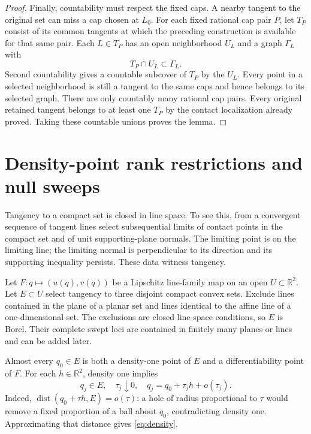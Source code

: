 \documentclass[11pt]{article}
\newcommand{\R}{\mathbb R}
\theoremstyle{remark}
\begin{document}
\begin{proof}
Finally, countability must respect the fixed caps. A nearby tangent to the original set can miss a cap chosen at $L_0$. For each fixed rational cap pair $P$, let $T_P$ consist of its common tangents at which the preceding construction is available for that same pair. Each $L\in T_P$ has an open neighborhood $U_L$ and a graph $\Gamma_L$ with
\[
T_P\cap U_L\subset\Gamma_L.
\]
Second countability gives a countable subcover of $T_P$ by the $U_L$. Every point in a selected neighborhood is still a tangent to the same caps and hence belongs to its selected graph. There are only countably many rational cap pairs. Every original retained tangent belongs to at least one $T_P$ by the contact localization already proved. Taking these countable unions proves the lemma.
\end{proof}

\section{Density-point rank restrictions and null sweeps}
Tangency to a compact set is closed in line space. To see this, from a convergent sequence of tangent lines select subsequential limits of contact points in the compact set and of unit supporting-plane normals. The limiting point is on the limiting line; the limiting normal is perpendicular to its direction and its supporting inequality persists. These data witness tangency.

Let $F:q\mapsto(u(q),v(q))$ be a Lipschitz line-family map on an open $U\subset\R^2$. Let $E\subset U$ select tangency to three disjoint compact convex sets. Exclude lines contained in the plane of a planar set and lines identical to the affine line of a one-dimensional set. The exclusions are closed line-space conditions, so $E$ is Borel. Their complete swept loci are contained in finitely many planes or lines and can be added later.

Almost every $q_0\in E$ is both a density-one point of $E$ and a differentiability point of $F$. For each $h\in\R^2$, density one implies
\begin{equation}\label{eq:density}
q_j\in E,\quad \tau_j\downarrow0,\quad
q_j=q_0+\tau_jh+o(\tau_j).
\end{equation}
Indeed, $\operatorname{dist}(q_0+\tau h,E)=o(\tau)$: a hole of radius proportional to $\tau$ would remove a fixed proportion of a ball about $q_0$, contradicting density one. Approximating that distance gives \eqref{eq:density}.
\end{document}
